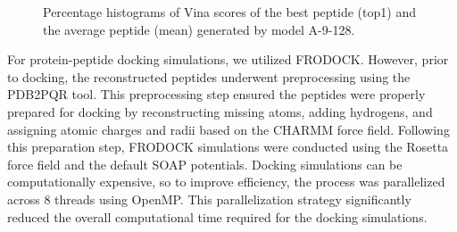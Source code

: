 \begin{figure}
  \center


  \caption{Percentage histograms of Vina scores of the best peptide (top1) and the average peptide (mean) generated by model A-9-128.}

  \label{fig:vina_A-9-128}
\end{figure}

For protein-peptide docking simulations, we utilized FRODOCK. However, prior to docking, the reconstructed peptides underwent preprocessing using the PDB2PQR tool. This preprocessing step ensured the peptides were properly prepared for docking by reconstructing missing atoms, adding hydrogens, and assigning atomic charges and radii based on the CHARMM force field. Following this preparation step, FRODOCK simulations were conducted using the Rosetta force field and the default SOAP potentials. Docking simulations can be computationally expensive, so to improve efficiency, the process was parallelized across 8 threads using OpenMP. This parallelization strategy significantly reduced the overall computational time required for the docking simulations.

